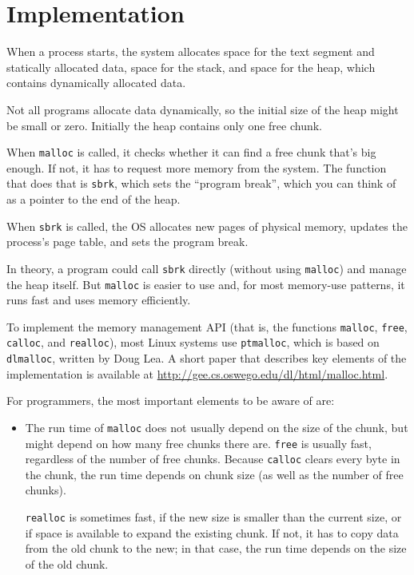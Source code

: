 \documentclass[12pt]{book}
\begin{document}
{%


\section{Implementation}

When a process starts, the system allocates space for the text segment
and statically allocated data, space for the stack, and space for the
heap, which contains dynamically allocated data.

Not all programs allocate data dynamically, so the initial size of the
heap might be small or zero.  Initially the heap contains only one
free chunk.

When {\tt malloc} is called, it checks whether it can find a free
chunk that's big enough.  If not, it has to request more memory
from the system.  The function that does that is {\tt sbrk},
which sets the ``program break'', which you can think of as a pointer
to the end of the heap.

When {\tt sbrk} is called, the OS allocates new pages of physical
memory, updates the process's page table, and sets the program
break.

In theory, a program could call {\tt sbrk} directly (without using
{\tt malloc}) and manage the heap itself.  But {\tt malloc} is easier
to use and, for most memory-use patterns, it runs fast and uses memory
efficiently.

To implement the memory management API (that is, the functions
{\tt malloc}, {\tt free}, {\tt calloc}, and {\tt realloc}),
most Linux systems use {\tt ptmalloc},
which is based on {\tt dlmalloc}, written by Doug Lea.  A short paper
that describes key elements of the implementation is
available at \url{http://gee.cs.oswego.edu/dl/html/malloc.html}.

For programmers, the most important elements to be aware of are:

\begin{itemize}

\item The run time of {\tt malloc} does not usually depend on the
size of the chunk, but might depend on how many free chunks there
are.  {\tt free} is usually fast, regardless of the number of
free chunks.  Because {\tt calloc} clears every byte in the chunk,
the run time depends on chunk size (as well as the number of free
chunks).

{\tt realloc} is sometimes fast, if the new size is smaller than the
current size, or if space is available to expand the existing chunk.
If not, it has to copy data from the old chunk to the new; in that
case, the run time depends on the size of the old chunk.


\end{itemize}}
\end{document}
